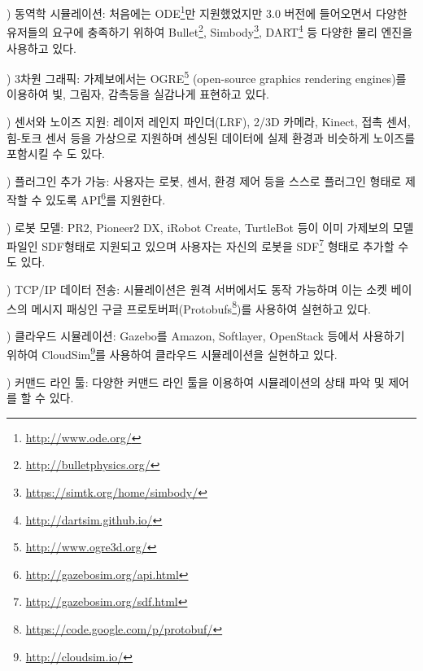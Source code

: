 \vspace{\baselineskip}
\noindent{}
\thenum) 동역학 시뮬레이션: 처음에는 ODE\footnote{\url{http://www.ode.org/}}만 지원했었지만 3.0 버전에 들어오면서 다양한 유저들의 요구에 충족하기 위하여 Bullet\footnote{\url{http://bulletphysics.org/}}, Simbody\footnote{\url{https://simtk.org/home/simbody/}}, DART\footnote{\url{http://dartsim.github.io/}} 등 다양한 물리 엔진을 사용하고 있다.

\vspace{\baselineskip}
\noindent{}
\thenum) 3차원 그래픽: 가제보에서는 OGRE\footnote{\url{http://www.ogre3d.org/}} (open-source graphics rendering engines)를 이용하여 빛, 그림자, 감촉등을 실감나게 표현하고 있다.

\vspace{\baselineskip}
\noindent{}
\thenum) 센서와 노이즈 지원: 레이저 레인지 파인더(LRF), 2/3D 카메라, Kinect, 접촉 센서, 힘-토크 센서 등을 가상으로 지원하며 센싱된 데이터에 실제 환경과 비슷하게 노이즈를 포함시킬 수 도 있다.

\vspace{\baselineskip}
\noindent{}
\thenum) 플러그인 추가 가능: 사용자는 로봇, 센서, 환경 제어 등을 스스로 플러그인 형태로 제작할 수 있도록 API\footnote{\url{http://gazebosim.org/api.html}}를 지원한다.

\vspace{\baselineskip}
\noindent{}
\thenum) 로봇 모델: PR2, Pioneer2 DX, iRobot Create, TurtleBot 등이 이미 가제보의 모델 파일인 SDF형태로 지원되고 있으며 사용자는 자신의 로봇을 SDF\footnote{\url{http://gazebosim.org/sdf.html}} 형태로 추가할 수도 있다.

\vspace{\baselineskip}
\noindent{}
\thenum) TCP/IP 데이터 전송: 시뮬레이션은 원격 서버에서도 동작 가능하며 이는 소켓 베이스의 메시지 패싱인 구글 프로토버퍼(Protobufs\footnote{\url{https://code.google.com/p/protobuf/}})를 사용하여 실현하고 있다.

\vspace{\baselineskip}
\noindent{}
\thenum) 클라우드 시뮬레이션: Gazebo를 Amazon, Softlayer, OpenStack 등에서 사용하기 위하여 CloudSim\footnote{\url{http://cloudsim.io/}}를 사용하여 클라우드 시뮬레이션을 실현하고 있다.

\vspace{\baselineskip}
\noindent{}
\thenum) 커맨드 라인 툴: 다양한 커맨드 라인 툴을 이용하여 시뮬레이션의 상태 파악 및 제어를 할 수 있다.

